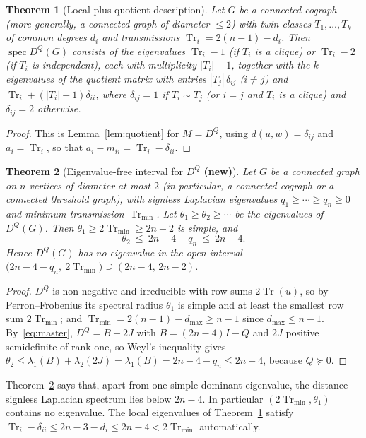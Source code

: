 \documentclass[11pt]{article}
\theoremstyle{plain}
\newtheorem{theorem}{Theorem}[section]
\theoremstyle{definition}
\theoremstyle{remark}
\DeclareMathOperator{\spec}{spec}
\DeclareMathOperator{\Tr}{Tr}
\begin{document}
	\begin{theorem}[Local-plus-quotient description]
		\label{thm:DQquotient}
		Let $G$ be a connected cograph (more generally, a connected graph of diameter $\le2$) with twin classes $T_1,\ldots,T_k$ of common degrees $d_i$ and transmissions $\Tr_i=2(n-1)-d_i$. Then $\spec D^Q(G)$ consists of the eigenvalues $\Tr_i-1$ (if $T_i$ is a clique) or $\Tr_i-2$ (if $T_i$ is independent), each with multiplicity $|T_i|-1$, together with the $k$ eigenvalues of the quotient matrix with entries $|T_j|\,\delta_{ij}$ ($i\ne j$) and $\Tr_i+(|T_i|-1)\delta_{ii}$, where $\delta_{ij}=1$ if $T_i\sim T_j$ (or $i=j$ and $T_i$ is a clique) and $\delta_{ij}=2$ otherwise.
	\end{theorem}
	\begin{proof}
		This is Lemma~\ref{lem:quotient} for $M=D^Q$, using $d(u,w)=\delta_{ij}$ and $a_i=\Tr_i$, so that $a_i-m_{ii}=\Tr_i-\delta_{ii}$. \qedhere
	\end{proof}
	
	\begin{theorem}[Eigenvalue-free interval for $D^Q$ \textbf{(new)}]
		\label{thm:DQfree}
		Let $G$ be a connected graph on $n$ vertices of diameter at most $2$ (in particular, a connected cograph or a connected threshold graph), with signless Laplacian eigenvalues $q_1\ge\cdots\ge q_n\ge0$ and minimum transmission $\Tr_{\min}$. Let $\theta_1\ge\theta_2\ge\cdots$ be the eigenvalues of $D^Q(G)$. Then $\theta_1\ge2\Tr_{\min}\ge2n-2$ is simple, and
		\[
		\theta_2\ \le\ 2n-4-q_n\ \le\ 2n-4 .
		\]
		Hence $D^Q(G)$ has no eigenvalue in the open interval $\bigl(2n-4-q_n,\ 2\Tr_{\min}\bigr)\supseteq(2n-4,\,2n-2)$.
	\end{theorem}
	\begin{proof}
		$D^Q$ is non-negative and irreducible with row sums $2\Tr(u)$, so by Perron--Frobenius its spectral radius $\theta_1$ is simple and at least the smallest row sum $2\Tr_{\min}$; and $\Tr_{\min}=2(n-1)-d_{\max}\ge n-1$ since $d_{\max}\le n-1$. By~\eqref{eq:master}, $D^Q=B+2J$ with $B=(2n-4)I-Q$ and $2J$ positive semidefinite of rank one, so Weyl's inequality gives $\theta_2\le\lambda_1(B)+\lambda_2(2J)=\lambda_1(B)=2n-4-q_n\le2n-4$, because $Q\succeq0$. \qedhere
	\end{proof}
	
	Theorem~\ref{thm:DQfree} says that, apart from one simple dominant eigenvalue, the distance signless Laplacian spectrum lies below $2n-4$. In particular $(2\Tr_{\min},\theta_1)$ contains no eigenvalue. The local eigenvalues of Theorem~\ref{thm:DQquotient} satisfy $\Tr_i-\delta_{ii}\le2n-3-d_i\le2n-4<2\Tr_{\min}$ automatically.
	
\end{document}
